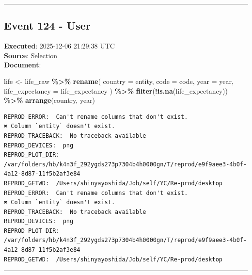 \documentclass[
  11pt,
]{article}
\newenvironment{Shaded}{\begin{snugshade}}{\end{snugshade}}
\newcommand{\AttributeTok}[1]{\textcolor[rgb]{0.13,0.29,0.53}{#1}}
\newcommand{\FunctionTok}[1]{\textcolor[rgb]{0.13,0.29,0.53}{\textbf{#1}}}
\newcommand{\NormalTok}[1]{#1}
\newcommand{\OtherTok}[1]{\textcolor[rgb]{0.56,0.35,0.01}{#1}}
\newcommand{\SpecialCharTok}[1]{\textcolor[rgb]{0.81,0.36,0.00}{\textbf{#1}}}
\newcommand{\StringTok}[1]{\textcolor[rgb]{0.31,0.60,0.02}{#1}}
\newenvironment{rpoutput}{\vspace{0.5em}\begin{snugshade}}{\end{snugshade}}
\begin{document}
\begin{center}\rule{0.5\linewidth}{0.5pt}\end{center}

\subsection{Event 124 - User}\label{event-124---user}

\textbf{Executed}: 2025-12-06 21:29:38 UTC\\
\textbf{Source}: Selection\\
\textbf{Document}:

\begin{Shaded}
\begin{Highlighting}[]
\NormalTok{life }\OtherTok{\textless{}{-}}\NormalTok{ life\_raw }\SpecialCharTok{\%\textgreater{}\%}
  \FunctionTok{rename}\NormalTok{(}
    \AttributeTok{country =}\NormalTok{ entity,}
    \AttributeTok{code =}\NormalTok{ code,}
    \AttributeTok{year =}\NormalTok{ year,}
    \AttributeTok{life\_expectancy =} \StringTok{\textasciigrave{}}\AttributeTok{life\_expectancy}\StringTok{\textasciigrave{}}
\NormalTok{  ) }\SpecialCharTok{\%\textgreater{}\%}
  \FunctionTok{filter}\NormalTok{(}\SpecialCharTok{!}\FunctionTok{is.na}\NormalTok{(life\_expectancy)) }\SpecialCharTok{\%\textgreater{}\%}
  \FunctionTok{arrange}\NormalTok{(country, year)}
\end{Highlighting}
\end{Shaded}

\begin{rpoutput}

\begin{verbatim}
REPROD_ERROR:  Can't rename columns that don't exist.
✖ Column `entity` doesn't exist. 
REPROD_TRACEBACK:  No traceback available  
REPROD_DEVICES:  png 
REPROD_PLOT_DIR:  /var/folders/hb/k4n3f_292ygds273p7304b4h0000gn/T/reprod/e9f9aee3-4b0f-4a12-8d87-11f5b2af3e84 
REPROD_GETWD:  /Users/shinyayoshida/Job/self/YC/Re-prod/desktop 
REPROD_ERROR:  Can't rename columns that don't exist.
✖ Column `entity` doesn't exist. 
REPROD_TRACEBACK:  No traceback available  
REPROD_DEVICES:  png 
REPROD_PLOT_DIR:  /var/folders/hb/k4n3f_292ygds273p7304b4h0000gn/T/reprod/e9f9aee3-4b0f-4a12-8d87-11f5b2af3e84 
REPROD_GETWD:  /Users/shinyayoshida/Job/self/YC/Re-prod/desktop 
\end{verbatim}

\end{rpoutput}

\begin{center}\rule{0.5\linewidth}{0.5pt}\end{center}
\end{document}
